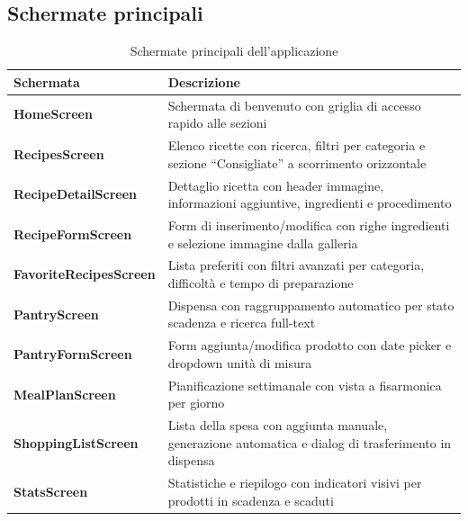 \documentclass[a4paper, 12pt]{article}
\begin{document}
\subsection{Schermate principali}
\begin{table}[H]
    \centering
    \renewcommand{\arraystretch}{1.5}
    \begin{tabularx}{\textwidth}{@{} >{\bfseries}l X @{}}
        \toprule
        \textbf{Schermata} & \textbf{Descrizione} \\
        
        \midrule
        HomeScreen & Schermata di benvenuto con griglia di accesso rapido alle sezioni \\
        \addlinespace
        RecipesScreen & Elenco ricette con ricerca, filtri per categoria e sezione “Consigliate” a scorrimento orizzontale \\
        \addlinespace
        RecipeDetailScreen & Dettaglio ricetta con header immagine, informazioni aggiuntive, ingredienti e procedimento \\
        \addlinespace
        RecipeFormScreen & Form di inserimento/modifica con righe ingredienti e selezione immagine dalla galleria \\
        \addlinespace
        FavoriteRecipesScreen & Lista preferiti con filtri avanzati per categoria, difficoltà e tempo di preparazione \\
        \addlinespace
        PantryScreen & Dispensa con raggruppamento automatico per stato scadenza e ricerca full-text \\
        \addlinespace
        PantryFormScreen & Form aggiunta/modifica prodotto con date picker e dropdown unità di misura \\
        \addlinespace
        MealPlanScreen & Pianificazione settimanale con vista a fisarmonica per giorno \\
        \addlinespace
        ShoppingListScreen & Lista della spesa con aggiunta manuale, generazione automatica e dialog di trasferimento in dispensa \\
        \addlinespace
        StatsScreen & Statistiche e riepilogo con indicatori visivi per prodotti in scadenza e scaduti \\
        
        \bottomrule
    \end{tabularx}
    \caption{Schermate principali dell'applicazione}
    \label{tab:requisiti_sistema}

\end{table}
\newpage
\end{document}
